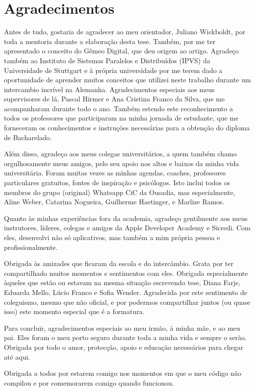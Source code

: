 \chapter*{Agradecimentos}

Antes de tudo, gostaria de agradecer ao meu orientador, Juliano Wickboldt, por toda a mentoria durante a elaboração desta tese. Também, por me ter apresentado o conceito do Gêmeo Digital, que deu origem ao artigo. Agradeço também ao Instituto de Sistemas Paralelos e Distribuídos (IPVS) da Universidade de Stuttgart e à própria universidade por me terem dado a oportunidade de aprender muitos conceitos que utilizei neste trabalho durante um intercambio incrível na Alemanha. Agradecimentos especiais aos meus supervisores de lá, Pascal Hirmer e Ana Cristina Franco da Silva, que me acompanharam durante todo o ano. Também estendo este reconhecimento a todos os professores que participaram na minha jornada de estudante, que me forneceram os conhecimentos e instruções necessárias para a obtenção do diploma de Bacharelado.

Além disso, agradeço aos meus colegas universitários, a quem também chamo orgulhosamente meus amigos, pelo seu apoio nos altos e baixos da minha vida universitária. Foram muitas vezes as minhas agendas, coaches, professores particulares gratuitos, fontes de inspiração e psicólogos. Isto inclui todos os membros do grupo (original) Whatsapp CiC da Ousadia, mas especialmente, Aline Weber, Catarina Nogueira, Guilherme Haetinger, e Marlize Ramos. 

Quanto às minhas experiências fora da academia, agradeço gentilmente aos meus instrutores, líderes, colegas e amigos da Apple Developer Academy e Sicredi. Com eles, desenvolvi não só aplicativos, mas também a mim própria pessoa e profissionalmente. 

Obrigada às amizades que ficaram da escola e do intercâmbio. Grata por ter compartilhado muitos momentos e sentimentos com eles. Obrigada especialmente àqueles que estão ou estavam na mesma situação escrevendo tese, Diana Farje, Eduarda Mello, Lúcio Franco e Sofia Wender. Agradecida por este sentimento de coleguismo, mesmo que não oficial, e por podermos compartilhar juntos (ou quase isso) este momento especial que é a formatura.

Para concluir, agradecimentos especiais ao meu irmão, à minha mãe, e ao meu pai. Eles foram o meu porto seguro durante toda a minha vida e sempre o serão. Obrigada por todo o amor, protecção, apoio e educação necessários para chegar até aqui.

Obrigada a todos por estarem comigo nos momentos em que o meu código não compilou e por comemorarem comigo quando funcionou.

\clearpage